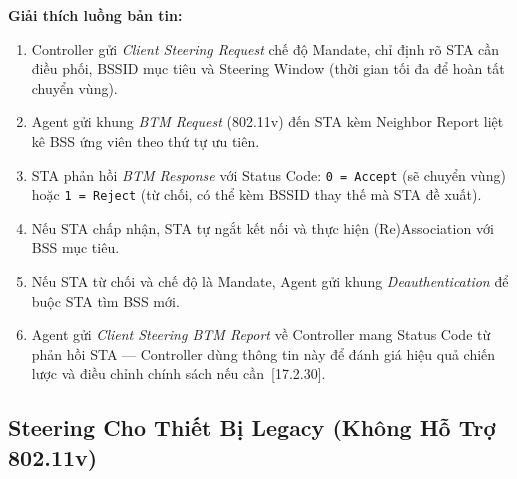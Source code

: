 \begin{center}
\end{center}

\textbf{Giải thích luồng bản tin:}
\begin{enumerate}
	\item Controller gửi \textit{Client Steering Request} chế độ Mandate, chỉ định
	rõ STA cần điều phối, BSSID mục tiêu và Steering Window (thời gian tối đa
	để hoàn tất chuyển vùng).
	\item Agent gửi khung \textit{BTM Request} (802.11v) đến STA kèm Neighbor Report
	liệt kê BSS ứng viên theo thứ tự ưu tiên.
	\item STA phản hồi \textit{BTM Response} với Status Code: \texttt{0 = Accept}
	(sẽ chuyển vùng) hoặc \texttt{1 = Reject} (từ chối, có thể kèm BSSID
	thay thế mà STA đề xuất).
	\item[\textbf{4a.}] Nếu STA chấp nhận, STA tự ngắt kết nối và thực hiện
	(Re)Association với BSS mục tiêu.
	\item[\textbf{4b*.}] Nếu STA từ chối và chế độ là Mandate, Agent gửi khung
	\textit{Deauthentication} để buộc STA tìm BSS mới.
	\item Agent gửi \textit{Client Steering BTM Report} về Controller mang Status Code
	từ phản hồi STA --- Controller dùng thông tin này để đánh giá hiệu quả
	chiến lược và điều chỉnh chính sách nếu cần~[17.2.30].
\end{enumerate}


\subsection{Steering Cho Thiết Bị Legacy (Không Hỗ Trợ 802.11v)}

